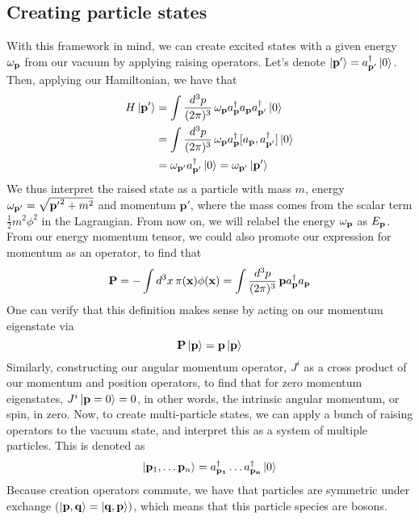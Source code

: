 \subsection{Creating particle states} 
With this framework in mind, we can create excited states with a given energy $\omega_\mathbf{  p }$ from our vacuum by applying raising operators. 
Let's denote $\ket { \mathbf{ p ' } }  = a^\dagger_{ \mathbf{  p '  }} \ket{ 0 } $. Then, applying our Hamiltonian, we have that 
\begin{align*} 
H \ket { \mathbf{ p } '} & = \int \frac{ d^3 p }{ (2 \pi)^3 } \, \omega_\mathbf{  p } a^\dagger_{ \mathbf{  p }} a_{ \mathbf{  p }} a^\dagger_{ \mathbf{  p'  }} \ket{0} \\
&= \int \frac{ d^3 p }{ (2 \pi)^3 } \, \omega_\mathbf{  p} a^\dagger_{ \mathbf{  p  }} [ a_{ \mathbf{  p  }}, a^\dagger_{ \mathbf{  p' }} ]\ket{ 0 } \\
&= \omega_\mathbf{  p '} a^\dagger_{ \mathbf{  p '  }} \ket{ 0 } = \omega_\mathbf{   p ' } \ket{ \mathbf{ p }'} 
\end{align*} 
We thus interpret the raised state as  a particle with mass $m$, energy $ \omega_\mathbf{  p' }  = \sqrt{ \mathbf{  p '  }^2 + m^ 2 }$  and momentum $ \mathbf{ p' } $, where the mass comes from the scalar term $\frac{ 1}{ 2} m^2 \phi^ 2 $ in the Lagrangian. From now on, we will relabel the energy $\omega_\mathbf{  p }$ as $E_{\mathbf{  p  }} $. From our energy momentum tensor, we could also promote our expression for momentum as an operator, to find that 
\[ 
\mathbf{  P  } =  - \int d^3 x\,  \pi (\mathbf{ x }) \phi ( \mathbf{ x })  = \int \frac{ d^3 p }{ (2 \pi)^3 } \, \mathbf{  p } a^\dagger_{ \mathbf{  p }} a_{ \mathbf{  p }} 
\] 
One can verify that this definition makes sense by acting on our momentum eigenstate via 
\[ 
\mathbf{  P  } \ket{ \mathbf{  p }}  = \mathbf{  p  } \ket{ \mathbf{  p  } } 
\] Similarly, constructing our angular momentum operator, $J^i $ as a cross product of our momentum and position operators, to find that for zero momentum eigenstates, $J^i \ket{ \mathbf{  p  } = 0 } = 0 $, in other words, the intrinsic angular momentum, or spin, in zero. Now, to create multi-particle states, we can apply a bunch of raising operators to the vacuum state, and interpret this as a system of multiple particles. 
This is denoted as 
\[ 
\ket{ \mathbf{  p  }_1, \dots \mathbf{  p } _n }  = a^\dagger_{ \mathbf{  p_1  }} \dots a^\dagger_{ \mathbf{  p_ n  }} \ket{ 0} 
\] Because creation operators commute, we have that particles are symmetric under exchange ($ \ket { \mathbf{  p  }, \mathbf{  q }} =  \ket { \mathbf{  q }, \mathbf{  p }})$, which means that this particle species are bosons. 

